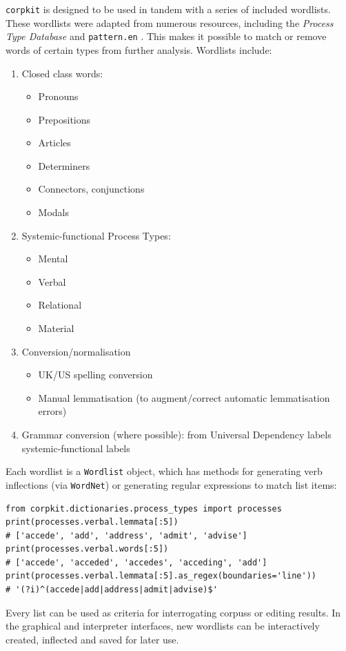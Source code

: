 \texttt{corpkit} is designed to be used in tandem with a series of included wordlists. These wordlists were adapted from numerous resources, including the \emph{Process Type Database} \cite{neale_more_2002} and \texttt{pattern.en} \cite{pattern_2012}. This makes it possible to match or remove words of certain types from further analysis. Wordlists include:
%
\begin{enumerate}
\item Closed class words:
\begin{itemize}
\item Pronouns
\item Prepositions
\item Articles
\item Determiners
\item Connectors, conjunctions
\item Modals
\end{itemize}
\item Systemic\hyp{}functional Process Types:~
\begin{itemize}
\item Mental
\item Verbal
\item Relational
\item Material
\end{itemize}
\item Conversion\slash normalisation
\begin{itemize}
\item UK\slash US spelling conversion
\item Manual lemmatisation (to augment\slash correct automatic lemmatisation errors)
\end{itemize}
\item Grammar conversion (where possible): from Universal Dependency labels \cite[see][]{nivre_towards_2015} systemic\hyp{}functional labels
\end{enumerate}
%
Each wordlist is a \texttt{Wordlist} object, which has methods for generating verb inflections (via \texttt{WordNet}) or generating regular expressions to match list items:

\begin{verbatim}
from corpkit.dictionaries.process_types import processes
print(processes.verbal.lemmata[:5])
# ['accede', 'add', 'address', 'admit', 'advise']
print(processes.verbal.words[:5])
# ['accede', 'acceded', 'accedes', 'acceding', 'add']
print(processes.verbal.lemmata[:5].as_regex(boundaries='line'))
# '(?i)^(accede|add|address|admit|advise)$'
\end{verbatim}
%
Every list can be used as criteria for interrogating \glspl{corpus} or editing results. In the graphical and interpreter interfaces, new wordlists can be interactively created, inflected and saved for later use.

